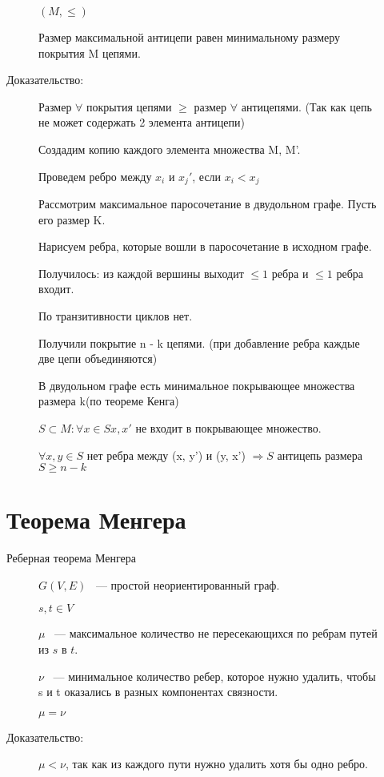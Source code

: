 \documentclass[12pt]{article}
\begin{document}
\begin{description}
\begin{description}
$(M, \le)$

Размер максимальной антицепи равен минимальному размеру покрытия M цепями. 

\item[Доказательство:]

Размер $\forall$ покрытия цепями $\ge$ размер $\forall$ антицепями. (Так как цепь не может содержать 2 элемента антицепи)

Создадим копию каждого элемента множества M, M'.

Проведем ребро между $x_i$ и $x_j'$, если $x_i < x_j$

Рассмотрим максимальное паросочетание в двудольном графе. Пусть его размер K. 

Нарисуем ребра, которые вошли в паросочетание в исходном графе. 

Получилось: из каждой вершины выходит $\le 1$ ребра и $\le 1$ ребра входит. 

По транзитивности циклов нет. 

Получили покрытие n - k цепями. (при добавление ребра каждые две цепи объединяются)

В двудольном графе есть минимальное покрывающее множества размера k(по теореме Кенга)

$S \subset M: \forall x \in S x, x'$ не входит в покрывающее множество. 

$\forall x, y \in S$ нет ребра между (x, y') и (y, x') $\Rightarrow S$ антицепь размера $S \ge n - k$ 

\end{description}

\section{Теорема Менгера} 
\begin{description}
\item[Реберная теорема Менгера] $G(V, E)$ ~--- простой неориентированный граф.

$s, t \in V$

$\mu$ ~--- максимальное количество не пересекающихся по ребрам  путей из $s$ в $t$.

$\nu$ ~--- минимальное количество ребер, которое нужно удалить, чтобы s и t оказались в разных компонентах связности.

$\mu = \nu$

\item[Доказательство:] 

 $\mu < \nu$, так как из каждого пути нужно удалить хотя бы одно ребро. 


\end{description}
\end{description}
\end{document}
